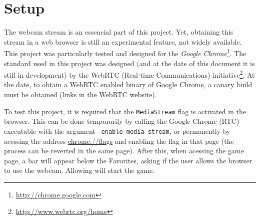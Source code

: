 \section{Setup}
\label{sec:setup}

The webcam stream is an essencial part of this project. Yet, obtaining this stream in a web browser is still an experimental feature, not widely available. This project was particularly tested and designed for the \textit{Google Chrome}\footnote{\url{http://chrome.google.com}}. The standard used in this project was designed (and at the date of this document it is still in development) by the WebRTC (Real-time Communications) initiative\footnote{\url{http://www.webrtc.org/home}}. At the date, to obtain a WebRTC enabled binary of Google Chrome, a canary build must be obtained (links in the WebRTC website).

To test this project, it is required that the \texttt{MediaStream} flag is activated in the browser. This can be done temporarily by calling the Google Chrome (RTC) executable with the argument \texttt{--enable-media-stream}, or permanently by acessing the address \url{chrome://flags} and enabling the flag in that page (the process can be reverted in the same page). After this, when acessing the game page, a bar will appear below the Favorites, asking if the user allows the browser to use the webcam. Allowing will start the game.